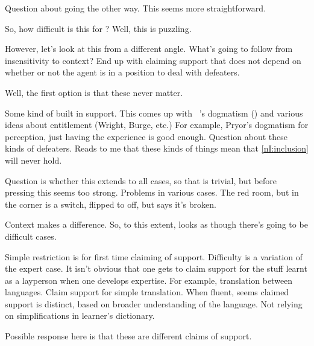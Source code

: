 \begin{note}
  Question about going the other way.
  This seems more straightforward.

  So, how difficult is this for \nI{}?
  Well, this is puzzling.

  However, let's look at this from a different angle.
  What's going to follow from insensitivity to context?
  End up with claiming support that does not depend on whether or not the agent is in a position to deal with defeaters.

  Well, the first option is that these never matter.

  Some kind of built in support.
  This comes up with ~\citeauthor{Pryor:2012tq}'s dogmatism (\cite{Pryor:2000tl,Pryor:2012tq}) and various ideas about entitlement (Wright, Burge, etc.)
  For example, Pryor's dogmatism for perception, just having the experience is good enough.
  Question about these kinds of defeaters.
  Reads to me that these kinds of things mean that \ref{nI:inclusion} will never hold.

  Question is whether this extends to all cases, so that \nI{} is trivial, but before pressing this seems too strong.
  Problems in various cases.
  The red room, but in the corner is a switch, flipped to off, but says it's broken.

  Context makes a difference.
  So, to this extent, looks as though there's going to be difficult cases.

  \color{red}
  Simple restriction is for first time claiming of support.
  Difficulty is a variation of the expert case.
  It isn't obvious that one gets to claim support for the stuff learnt as a layperson when one develops expertise.
  For example, translation between languages.
  Claim support for simple translation.
  When fluent, seems claimed support is distinct, based on broader understanding of the language.
  Not relying on simplifications in learner's dictionary.

  Possible response here is that these are different claims of support.
\end{note}

